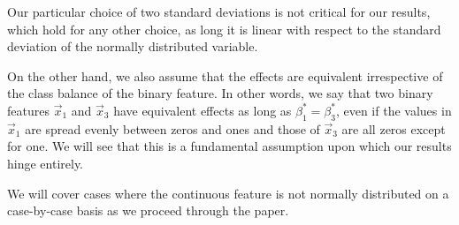 Our particular choice of two standard deviations is not critical for our results, which hold for any other choice, as long it is linear with respect to the standard deviation of the normally distributed variable.

On the other hand, we also assume that the effects are equivalent irrespective of the class balance of the binary feature. In other words, we say that two binary features \(\vec{x}_1\) and \(\vec{x}_3\) have equivalent effects as long as \(\beta_1^* = \beta_3^*\), even if the values in \(\vec{x}_1\) are spread evenly between zeros and ones and those of \(\vec{x}_3\) are all zeros except for one. We will see that this is a fundamental assumption upon which our results hinge entirely.

We will cover cases where the continuous feature is not normally distributed on a case-by-case basis as we proceed through the paper.

